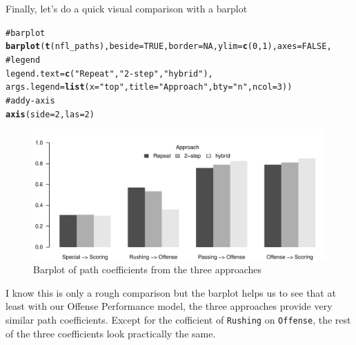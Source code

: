 \documentclass[12pt]{book}\usepackage{graphicx, color}
\makeatletter
\newcommand{\hlfunctioncall}[1]{\textcolor[rgb]{0.501960784313725,0,0.329411764705882}{\textbf{#1}}}%
\newcommand{\hlstring}[1]{\textcolor[rgb]{0.6,0.6,1}{#1}}%
\newcommand{\hlcomment}[1]{\textcolor[rgb]{0.180392156862745,0.6,0.341176470588235}{#1}}%
\newenvironment{kframe}{%
 \def\at@end@of@kframe{}%
 \ifinner\ifhmode%
  \def\at@end@of@kframe{\end{minipage}}%
  \begin{minipage}{\columnwidth}%
 \fi\fi%
 \def\FrameCommand##1{\hskip\@totalleftmargin \hskip-\fboxsep
 \colorbox{shadecolor}{##1}\hskip-\fboxsep
     \hskip-\linewidth \hskip-\@totalleftmargin \hskip\columnwidth}%
 \MakeFramed {\advance\hsize-\width
   \@totalleftmargin\z@ \linewidth\hsize
   \@setminipage}}%
 {\par\unskip\endMakeFramed%
 \at@end@of@kframe}
\newenvironment{knitrout}{}{} %
\newcommand{\code}[1]{\texttt{#1}}
\makeatother
\begin{document}
Finally, let's do a quick visual comparison with a barplot
\begin{knitrout}
\color{fgcolor}\begin{kframe}
\begin{alltt}
\hlcomment{# barplot}
\hlfunctioncall{barplot}(\hlfunctioncall{t}(nfl_paths), beside=TRUE, border=NA, ylim=\hlfunctioncall{c}(0,1), axes=FALSE,
\hlcomment{        # legend}
        legend.text = \hlfunctioncall{c}(\hlstring{"Repeat"}, \hlstring{"2-step"}, \hlstring{"hybrid"}),
        args.legend=\hlfunctioncall{list}(x=\hlstring{"top"}, title=\hlstring{"Approach"}, bty=\hlstring{"n"}, ncol=3))
\hlcomment{# add y-axis}
\hlfunctioncall{axis}(side = 2, las = 2)
\end{alltt}
\end{kframe}\begin{figure}[h]


{\centering \includegraphics[width=1\linewidth,height=.5\linewidth]{figure/barplot_nfl_paths} 

}

\caption[Barplot of path coefficients from the three approaches]{Barplot of path coefficients from the three approaches\label{fig:barplot_nfl_paths}}
\end{figure}


\end{knitrout}


I know this is only a rough comparison but the barplot helps us to see that at least with our Offense Performance model, the three approaches provide very similar path coefficients. Except for the cofficient of \code{Rushing} on \code{Offense}, the rest of the three coefficients look practically the same. 
\end{document}
